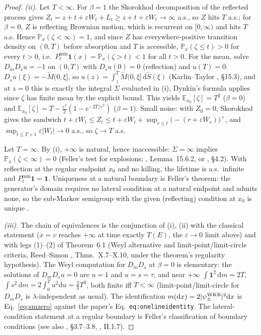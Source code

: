 \documentclass[11pt]{article}
\theoremstyle{remark}
\newcommand{\dd}{\mathrm{d}}
\newcommand{\E}{\mathbb{E}}
\newcommand{\Prob}{\mathbb{P}}
\begin{document}
\begin{proof}
\emph{(ii).}  Let $T<\infty$.  For $\beta=1$ the Skorokhod
decomposition of the reflected process gives
$Z_{t}=z+t+\varepsilon W_{t}+L_{t}\ge z+t+\varepsilon W_{t}\to\infty$
a.s., so $Z$ hits $T$ a.s.; for $\beta=0$, $Z$ is reflecting Brownian
motion, which is recurrent on $[0,\infty)$ and hits $T$ a.s.  Hence
$\Prob_{x}(\zeta<\infty)=1$, and since $Z$ has everywhere-positive
transition density on $(0,T)$ before absorption and $T$ is accessible,
$\Prob_{x}(\zeta\le t)>0$ for every $t>0$, i.e.\
$P^{\min}_{t}\mathbf 1(x)=\Prob_{x}(\zeta>t)<1$ for all $t>0$.  For the
mean, solve $D_{\tilde m}D_{\tilde s}u=-1$ on $(0,T)$ with
$D_{\tilde s}u(0)=0$ (reflection) and $u(T)=0$:
$D_{\tilde s}u(\xi)=-\tilde M(0,\xi]$, so
$u(z)=\int_{z}^{T}\tilde M(0,\xi]\,\dd\tilde S(\xi)$
(Karlin--Taylor \cite{KarlinTaylor}, \S15.3), and at $z=0$ this is
exactly the integral $\Sigma$ evaluated in (i); Dynkin's formula
applies since $\zeta$ has finite mean by the explicit bound.  This
yields $\E_{x_{0}}[\zeta]=T^{2}$ ($\beta=0$) and
$\E_{x_{0}}[\zeta]=T-\tfrac{\varepsilon^{2}}{2}
(1-e^{-2T/\varepsilon^{2}})$ ($\beta=1$).  Small noise:
with $Z_{0}=0$, Skorokhod gives the sandwich
$t+\varepsilon W_{t}\le Z_{t}\le t+\varepsilon W_{t}
+\sup_{r\le t}\bigl(-(r+\varepsilon W_{r})\bigr)^{+}$, and
$\sup_{t\le T+1}\varepsilon|W_{t}|\to0$ a.s., so
$\zeta\to T$ a.s.

Let $T=\infty$.  By (i), $+\infty$ is natural, hence inaccessible:
$\Sigma=\infty$ implies $\Prob_{x}(\zeta<\infty)=0$ (Feller's test for
explosions; \cite{KarlinTaylor}, Lemma~15.6.2, or
\cite{ItoMcKean}, \S4.2).  With reflection at the regular endpoint
$x_{0}$ and no killing, the lifetime is a.s.\ infinite and
$P^{\min}_{t}\mathbf 1=\mathbf 1$.  Uniqueness at a natural boundary
is Feller's theorem: the generator's domain requires no lateral
condition at a natural endpoint and admits none, so the sub-Markov
semigroup with the given (reflecting) condition at $x_{0}$ is unique
\cite{Feller1952,Feller1957}.

\emph{(iii).}  The chain of equivalences is the conjunction of (i),
(ii) with the classical statement ($\dot x=v$ reaches $+\infty$ at
time exactly $T(E)$, the $\varepsilon\to0$ limit above) and with legs
(1)--(2) of Theorem~6.1 (Weyl alternative and limit-point/limit-circle
criteria, Reed--Simon \cite{ReedSimon2}, Thms.~X.7--X.10, under the
theorem's regularity hypothesis).  The Weyl computation for
$D_{m}D_{s}$ at $\beta=0$ is elementary: the solutions of
$D_{m}D_{s}u=0$ are $u=1$ and $u=s=\tau$, and near $+\infty$
$\int\mathbf 1^{2}\,\dd m=2T$,
$\int s^{2}\,\dd m=2\int_{0}^{T}u^{2}\dd u=\tfrac23T^{3}$, both finite
iff $T<\infty$ (limit-point/limit-circle for $D_{m}D_{s}$ is
$\lambda$-independent as usual).  The identification
$m(\dd x)=2|\psi^{\rm WKB}_{\pm}|^{2}\dd x$ is
Eq.~\eqref{eq:smzero} against the paper's
Eq.~\texttt{eq:onelineidentity}.  The lateral-condition statement at a
regular boundary is Feller's classification of boundary conditions
\cite{Feller1957} (see also \cite{ItoMcKean}, \S3.7--3.8,
\cite{BorodinSalminen}, II.1.7).


\end{proof}
\end{document}
